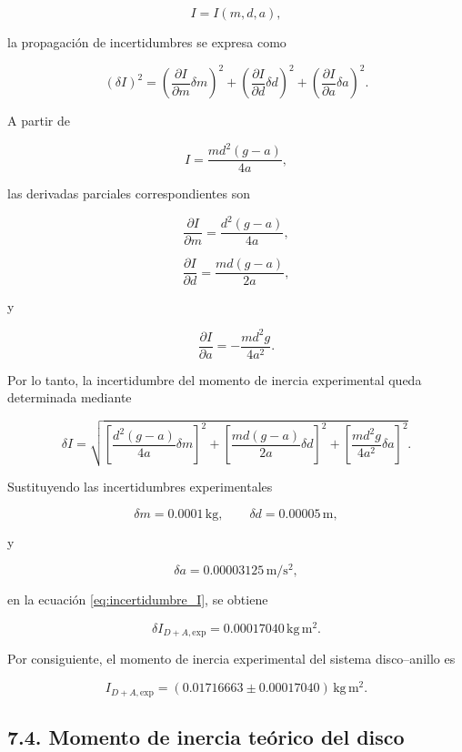 \documentclass[11pt,a4paper]{article}
\begin{document}
\[
    I=I(m,d,a),
\]

la propagación de incertidumbres se expresa como

\[
(\delta I)^2
=
\left(
\frac{\partial I}{\partial m}\delta m
\right)^2
+
\left(
\frac{\partial I}{\partial d}\delta d
\right)^2
+
\left(
\frac{\partial I}{\partial a}\delta a
\right)^2.
\]

A partir de

\[
I=
\frac{m d^2(g-a)}{4a},
\]

las derivadas parciales correspondientes son

\[
\frac{\partial I}{\partial m}
=
\frac{d^2(g-a)}{4a},
\]

\[
\frac{\partial I}{\partial d}
=
\frac{m d(g-a)}{2a},
\]

y

\[
\frac{\partial I}{\partial a}
=
-\frac{m d^2g}{4a^2}.
\]

Por lo tanto, la incertidumbre del momento de inercia experimental queda
determinada mediante

\begin{equation}
\delta I =
\sqrt{
\left[
\frac{d^2(g-a)}{4a}\delta m
\right]^2
+
\left[
\frac{m d(g-a)}{2a}\delta d
\right]^2
+
\left[
\frac{m d^2g}{4a^2}\delta a
\right]^2
}.
\label{eq:incertidumbre_I}
\end{equation}

Sustituyendo las incertidumbres experimentales

\[
\delta m=0.0001\,\mathrm{kg},
\qquad
\delta d=0.00005\,\mathrm{m},
\]

y

\[
\delta a=0.00003125\,\mathrm{m/s^2},
\]

en la ecuación \eqref{eq:incertidumbre_I}, se obtiene

\[
\delta I_{D+A,\mathrm{exp}}
=
0.00017040\,\mathrm{kg\,m^2}.
\]

Por consiguiente, el momento de inercia experimental del sistema
disco--anillo es

\begin{equation}
I_{D+A,\mathrm{exp}}
=
(0.01716663\pm0.00017040)\,\mathrm{kg\,m^2}.
\label{eq:I_exp_final}
\end{equation}



\subsection*{7.4. Momento de inercia teórico del disco}
\end{document}

